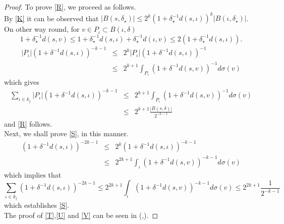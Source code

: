 \documentclass[10pt]{article}
\theoremstyle{definition}
\numberwithin{equation}{section}
\begin{document}
	\begin{proof}
		\normalfont
To prove \eqref{R}, we proceed as follows.\\
By \eqref{K} it can be observed that  $|B(s, \delta_{\star})| \leq 2^k \left(1+ \delta_{\star}^{-1} d(s, \iota)\right)^k |B(\iota, \delta_{\star})|$. On other way round, for $v \in P_{\iota} \subset B(\iota, \delta)$
		$$ 1 + \delta_{\star}^{-1} d(s,v) \leq 1 + \delta_{\star}^{-1} d(s,\iota) + \delta_{\star}^{-1} d(\iota,v) \leq 2 \left(1 + \delta_{\star}^{-1} d(s,\iota)\right). $$
		\begin{eqnarray*}
			|P_{\iota}|(1+\delta^{-1}d(s,\iota))^{-k-1} &\leq & 2^k|P_{\iota}|(1+\delta^{-1}d(s,\iota))^{-1}\\
			&\leq & 2^{k+1}\displaystyle\int_{P_{\iota}}(1+\delta^{-1}d(s,v))^{-1} d\sigma (v)
		\end{eqnarray*}
		which gives
\begin{eqnarray*}
\sum_{\iota \in k_j}|P_{\iota}|(1+\delta^{-1}d(s,\iota))^{-k-1}
		&\leq&  2^{k+1}\displaystyle\int_{P_{\iota}}(1+\delta^{-1}d(s,v))^{-1} d\sigma (v)\\
		&\leq&  2^{k+1} \frac{|B(s,\delta)|}{2^{-k-1}}
\end{eqnarray*}
		and \eqref{R} follows.\\
		Next, we shall prove \eqref{S}, in this manner.\\
		\begin{eqnarray*}
			(1+\delta^{-1}d(s,\iota))^{-2k-1} &\leq &2^k(1+\delta^{-1}d(s,\iota))^{-k-1}\\
			&\leq & 2^{2k+1}\displaystyle\int_{\iota} (1+\delta^{-1}d(s,v))^{-k-1}d \sigma (v)
		\end{eqnarray*}
		which implies that
		$$\sum_{\iota \in k_j}(1+\delta^{-1}d(s,\iota))^{-2k-1}\leq
		2^{2k+1}\displaystyle\int_{\iota} (1+\delta^{-1}d(s,v))^{-k-1} d\sigma(v) \leq 2^{2k+1}\frac{1}{2^{-k-1}}$$
		which establishes \eqref{S}.\\
		The proof of \eqref{T},\eqref{U} and \eqref{V} can be seen in (\cite{Coulhon1},\cite{Coulhon2}).
	\end{proof}
\end{document}
